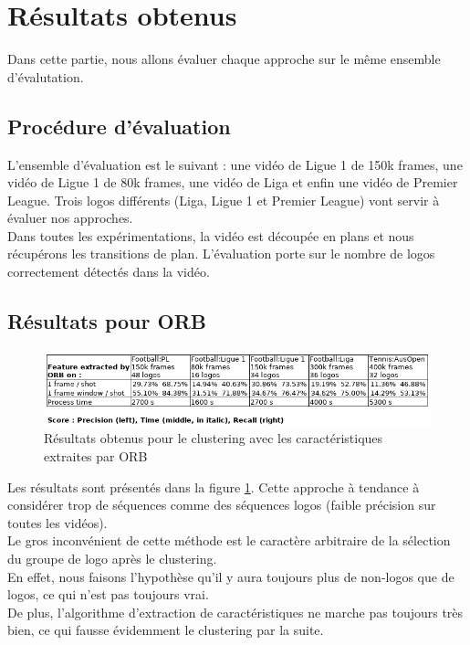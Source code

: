\documentclass[11pt]{article}
\begin{document}
\newpage
\section{Résultats obtenus}
\label{sec:org72ead63}
Dans cette partie, nous allons évaluer chaque approche sur le même ensemble d'évalutation.\\

\subsection{Procédure d'évaluation}
\label{sec:org0da0648}
L'ensemble d'évaluation est le suivant : une vidéo de Ligue 1 de 150k frames, une vidéo de Ligue 1 de 80k frames, une vidéo de Liga et enfin une vidéo de Premier League. Trois logos différents (Liga, Ligue 1 et Premier League) vont servir à évaluer nos approches.\\
Dans toutes les expérimentations, la vidéo est découpée en plans et nous récupérons les transitions de plan. L'évaluation porte sur le nombre de logos correctement détectés dans la vidéo.\\

\subsection{Résultats pour ORB}
\label{sec:org471d6af}
\begin{figure}[htbp]
\centering
\includegraphics[width=15cm]{res_orb.png}
\caption{Résultats obtenus pour le clustering avec les caractéristiques extraites par ORB \label{orb-res}}
\end{figure}

Les résultats sont présentés dans la figure \ref{orb-res}. Cette approche à tendance à considérer trop de séquences comme des séquences logos (faible précision sur toutes les vidéos).\\
Le gros inconvénient de cette méthode est le caractère arbitraire de la sélection du groupe de logo après le clustering.\\
En effet, nous faisons l'hypothèse qu'il y aura toujours plus de non-logos que de logos, ce qui n'est pas toujours vrai.\\
De plus, l'algorithme d'extraction de caractéristiques ne marche pas toujours très bien, ce qui fausse évidemment le clustering par la suite.\\
\end{document}
